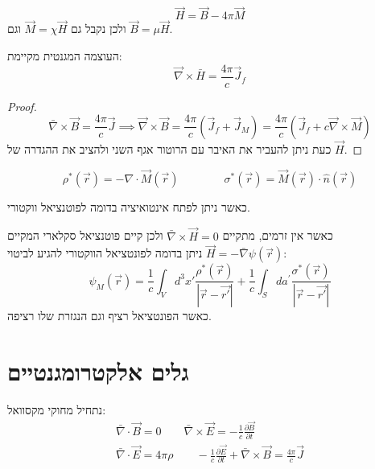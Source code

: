\documentclass{tstextbook}
\begin{document}
\begin{definition}
$$\vec{H}=\vec{B}-4\pi\vec{M}$$
ולכן נקבל גם \(\vec{M}=\chi \vec{H}\) וגם \(\vec{B}=\mu \vec{H}\).

\end{definition}
\begin{proposition}
העוצמה המגנטית מקיימת:
$$\vec{\nabla}\times \bar{H}=\frac{4\pi}{c}\vec{J}_{f}$$

\end{proposition}
\begin{proof}
$$\bar{\nabla} \times \vec{B} =\frac{4\pi}{c}\vec{J}\implies\vec{\nabla}\times\vec{B}={\frac{4\pi}{c}}\left(\vec{J}_{f}+\vec{J}_{M}\right)={\frac{4\pi}{c}}\left(\vec{J}_{f}+c\vec{\nabla}\times\vec{M}\right)$$
כעת ניתן להעביר את האיבר עם הרוטור אגף השני ולהציב את ההגדרה של \(\vec{H}\).

\end{proof}
\begin{definition}
$$\rho^{*}(\vec{r})=-\nabla\cdot\vec{M}(\vec{r})\qquad\qquad\sigma^{*}(\vec{r})=\vec{M}(\vec{r})\cdot\hat{n}(\vec{r})$$

\end{definition}
כאשר ניתן לפתח אינטואיציה בדומה לפוטנציאל ווקטורי.

\begin{proposition}
כאשר אין זרמים, מתקיים \(\bar{\nabla} \times \vec{H}=0\) ולכן קיים פוטנציאל סקלארי המקיים \(\vec{H}=-\bar{\nabla}\psi\left( \vec{r} \right)\) ניתן בדומה לפונטציאל הווקטורי להגיע לביטוי:
$$\psi_{M}(\vec{r})=\frac{1}{c}\int_{V}d^{3}x'\frac{\rho^{*}(\vec{r})}{|\vec{r}-\vec{r'}|}+\frac{1}{c}\int_{S}d a^{\prime}\frac{\sigma^{*}(\vec{r})}{|\vec{r}-\vec{r'}|}$$
כאשר הפונטציאל רציף וגם הנגזרת שלו רציפה.

\end{proposition}

\section{גלים אלקטרומגנטיים}

נתחיל מחוקי מקסוואל:
\begin{gather*} \bar{\nabla} \cdot \vec{B} = 0 \qquad \bar{\nabla} \times \vec{E} = -\frac{1}{c} \frac{\partial \vec{B}}{\partial t} \\\bar{\nabla} \cdot \vec{E}=4\pi \rho \qquad -\frac{1}{c}\frac{\partial \vec{E}}{\partial t} + \bar{\nabla} \times \vec{B} = \frac{4\pi}{c}\vec{J} 
\end{gather*}
\end{document}
